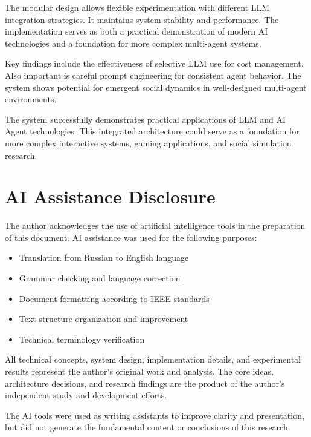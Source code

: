 \documentclass[conference]{IEEEtran}
\begin{document}
The modular design allows flexible experimentation with different LLM integration strategies. It maintains system stability and performance. The implementation serves as both a practical demonstration of modern AI technologies and a foundation for more complex multi-agent systems.

Key findings include the effectiveness of selective LLM use for cost management. Also important is careful prompt engineering for consistent agent behavior. The system shows potential for emergent social dynamics in well-designed multi-agent environments.

The system successfully demonstrates practical applications of LLM and AI Agent technologies. This integrated architecture could serve as a foundation for more complex interactive systems, gaming applications, and social simulation research.

\section{AI Assistance Disclosure}

The author acknowledges the use of artificial intelligence tools in the preparation of this document. AI assistance was used for the following purposes:

\begin{itemize}
\item Translation from Russian to English language
\item Grammar checking and language correction
\item Document formatting according to IEEE standards
\item Text structure organization and improvement
\item Technical terminology verification
\end{itemize}

All technical concepts, system design, implementation details, and experimental results represent the author's original work and analysis. The core ideas, architecture decisions, and research findings are the product of the author's independent study and development efforts.

The AI tools were used as writing assistants to improve clarity and presentation, but did not generate the fundamental content or conclusions of this research.
\end{document}
